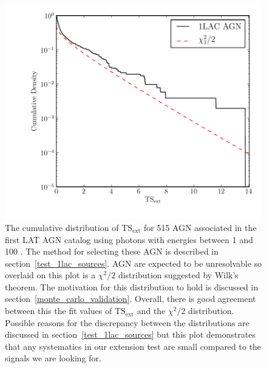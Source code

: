 \documentclass[12pt,preprint]{aastex}
\newcommand{\gev}{\text{GeV}\xspace}
\newcommand{\tsext}{{\ensuremath{\text{TS}_\text{ext}}}\xspace}
\begin{document}
\clearpage
\begin{figure}
  \begin{center}
    \includegraphics{source_plots/agn.pdf}
    \end{center}
    \caption{The cumulative distribution of \tsext for 515 AGN associated
    in the first LAT AGN catalog using photons with energies between 1
    \gev and 100 \gev.  The method for selecting these AGN is described in
    section~\ref{test_1lac_sources}.  AGN are expected to be unresolvable
    so overlaid on this plot is a $\chi^2/2$ distribution suggested by
    Wilk's theorem.  The motivation for this distribution to hold is
    discussed in section~\ref{monte_carlo_validation}.  Overall, there
    is good agreement between this the fit values of \tsext and the
    $\chi^2/2$ distribution.  Possible reasons for the discrepancy between
    the distributions are discussed in section~\ref{test_1lac_sources}
    but this plot demonstrates that any systematics in our extension
    test are small compared to the signals we are looking for.
    }\label{agn_ts_ext}
  \end{figure}


\end{document}
